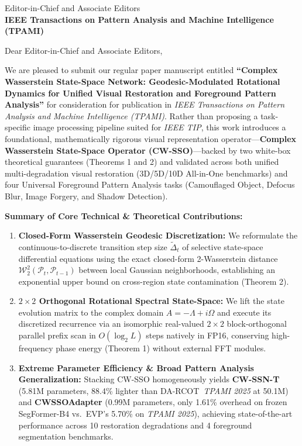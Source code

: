 \documentclass[11pt]{letter}
\begin{document}
\begin{letter}{Editor-in-Chief and Associate Editors\\
\textbf{IEEE Transactions on Pattern Analysis and Machine Intelligence (TPAMI)}}

\opening{Dear Editor-in-Chief and Associate Editors,}

We are pleased to submit our regular paper manuscript entitled \textbf{``Complex Wasserstein State-Space Network: Geodesic-Modulated Rotational Dynamics for Unified Visual Restoration and Foreground Pattern Analysis''} for consideration for publication in \emph{IEEE Transactions on Pattern Analysis and Machine Intelligence (TPAMI)}. Rather than proposing a task-specific image processing pipeline suited for \emph{IEEE TIP}, this work introduces a foundational, mathematically rigorous visual representation operator---\textbf{Complex Wasserstein State-Space Operator (CW-SSO)}---backed by two white-box theoretical guarantees (Theorems 1 and 2) and validated across both unified multi-degradation visual restoration (3D/5D/10D All-in-One benchmarks) and four Universal Foreground Pattern Analysis tasks (Camouflaged Object, Defocus Blur, Image Forgery, and Shadow Detection).

\vspace{0.5em}
\textbf{Summary of Core Technical & Theoretical Contributions:}
\begin{enumerate}
    \item \textbf{Closed-Form Wasserstein Geodesic Discretization:} We reformulate the continuous-to-discrete transition step size $\tilde{\Delta}_t$ of selective state-space differential equations using the exact closed-form 2-Wasserstein distance $\mathcal{W}_2^2(\mathcal{P}_t, \mathcal{P}_{t-1})$ between local Gaussian neighborhoods, establishing an exponential upper bound on cross-region state contamination (Theorem 2).
    \item \textbf{$2 \times 2$ Orthogonal Rotational Spectral State-Space:} We lift the state evolution matrix to the complex domain $A = -\Lambda + i\Omega$ and execute its discretized recurrence via an isomorphic real-valued $2 \times 2$ block-orthogonal parallel prefix scan in $O(\log_2 L)$ steps natively in FP16, conserving high-frequency phase energy (Theorem 1) without external FFT modules.
    \item \textbf{Extreme Parameter Efficiency & Broad Pattern Analysis Generalization:} Stacking CW-SSO homogeneously yields \textbf{CW-SSN-T} (5.81M parameters, 88.4\% lighter than DA-RCOT~\emph{TPAMI 2025} at 50.1M) and \textbf{CWSSOAdapter} (0.99M parameters, only 1.61\% overhead on frozen SegFormer-B4 vs.\ EVP's 5.70\% on \emph{TPAMI 2025}), achieving state-of-the-art performance across 10 restoration degradations and 4 foreground segmentation benchmarks.
\end{enumerate}


\end{letter}
\end{document}
